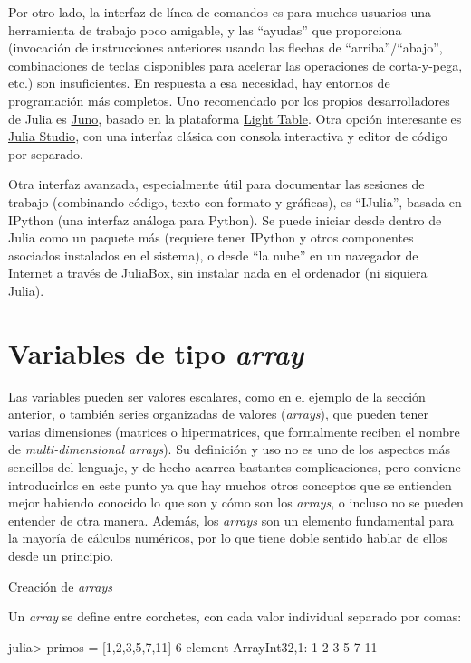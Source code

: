 ﻿\documentclass[spanish]{article}
\begin{document}
Por otro lado, la interfaz de línea de comandos es para muchos usuarios una herramienta de trabajo poco amigable, y las ``ayudas'' que proporciona (invocación de instrucciones anteriores usando las flechas de ``arriba''/``abajo'', combinaciones de teclas disponibles para acelerar las operaciones de corta-y-pega, etc.) son insuficientes. En respuesta a esa necesidad, hay entornos de programación más completos. Uno recomendado por los propios desarrolladores de Julia es \href{http://junolab.org/}{Juno}, basado en la plataforma \href{http://lighttable.com/}{Light Table}. Otra opción interesante es \href{http://forio.com/products/julia-studio/}{Julia Studio}, con una interfaz clásica con consola interactiva y editor de código por separado.

Otra interfaz avanzada, especialmente útil para documentar las sesiones de trabajo (combinando código, texto con formato y gráficas), es ``IJulia'', basada en IPython (una interfaz análoga para Python). Se puede iniciar desde dentro de Julia como un paquete más (requiere tener IPython y otros componentes asociados instalados en el sistema), o desde ``la nube'' en un navegador de Internet a través de \href{https://www.juliabox.org/}{JuliaBox}, sin instalar nada en el ordenador (ni siquiera Julia).


\section{Variables de tipo \emph{array}}

Las variables pueden ser valores escalares, como en el ejemplo de la sección anterior, o también series organizadas de valores (\emph{arrays}), que pueden tener varias dimensiones (matrices o hipermatrices, que formalmente reciben el nombre de \emph{multi-dimensional arrays}). Su definición y uso no es uno de los aspectos más sencillos del lenguaje, y de hecho acarrea bastantes complicaciones, pero conviene introducirlos en este punto ya que hay muchos otros conceptos que se entienden mejor habiendo conocido lo que son y cómo son los \emph{arrays}, o incluso no se pueden entender de otra manera. Además, los \emph{arrays} son un elemento fundamental para la mayoría de cálculos numéricos, por lo que tiene doble sentido hablar de ellos desde un principio.

Creación de \emph{arrays}

Un \emph{array} se define entre corchetes, con cada valor individual separado por comas:

julia> primos = [1,2,3,5,7,11]
6-element Array{Int32,1}:
 1
 2
 3
 5
 7
 11
\end{document}
